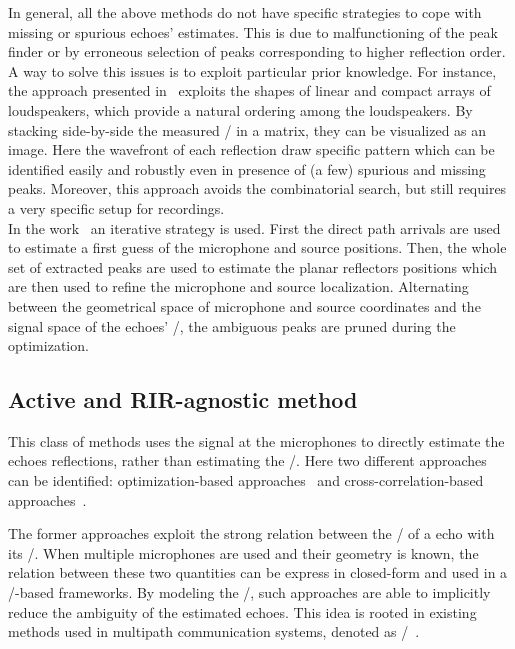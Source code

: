 \mynewline
In general, all the above methods do not have specific strategies to cope with missing or spurious echoes' estimates.
This is due to malfunctioning of the peak finder or by erroneous selection of peaks corresponding to higher reflection order.
A way to solve this issues is to exploit particular prior knowledge.
For instance, the approach presented in~ exploits the shapes of linear and compact arrays of loudspeakers, which provide a natural ordering among the loudspeakers.
By stacking side-by-side the measured \RIRs/ in a matrix, they can be visualized as an image.
Here the wavefront of each reflection draw specific pattern which can be identified easily and robustly even in presence of (a few) spurious and missing peaks.
Moreover, this approach avoids the combinatorial search, but still requires a very specific setup for recordings.
\\In the work~ an iterative strategy is used.
First the direct path arrivals are used to estimate a first guess of the microphone and source positions.
Then, the whole set of extracted peaks are used to estimate the planar reflectors positions which are then used to refine the microphone and source localization.
Alternating between the geometrical space of microphone and source coordinates and the signal space of the echoes' \TOAs/, the ambiguous peaks are pruned during the optimization.

\subsection{Active and RIR-agnostic method}
This class of methods uses the signal at the microphones to directly estimate the echoes reflections, rather than estimating the \RIRs/.
Here two different approaches can be identified: optimization-based approaches~ and cross-correlation-based approaches~.

\mynewline
The former approaches exploit the strong relation between the \TOA/ of a echo with its \DOA/.
When multiple microphones are used and their geometry is known, the relation between these two quantities can be express in closed-form and used in a \ML/-based frameworks.
By modeling the \DOAs/, such approaches are able to implicitly reduce the ambiguity of the estimated echoes.
This idea is rooted in existing methods used in multipath communication systems, denoted as \JADE/~.

